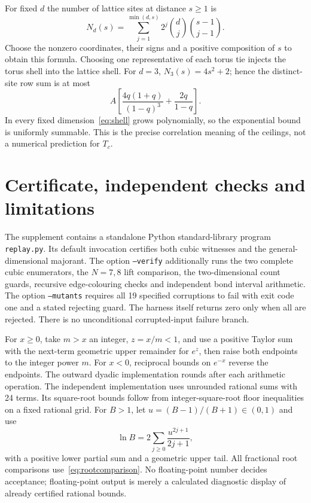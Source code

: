 \documentclass[11pt]{article}
\theoremstyle{plain}
\theoremstyle{remark}
\begin{document}
For fixed $d$ the number of lattice sites at distance $s\ge1$ is
\begin{equation}\label{eq:shell}
N_d(s)=\sum_{j=1}^{\min(d,s)}2^j\binom dj\binom{s-1}{j-1}.
\end{equation}
Choose the nonzero coordinates, their signs and a positive composition of
$s$ to obtain this formula. Choosing one representative of each torus tie
injects the torus shell into the lattice shell. For $d=3$, $N_3(s)=4s^2+2$;
hence the distinct-site row sum is at most
\[
A\left[\frac{4q(1+q)}{(1-q)^3}+\frac{2q}{1-q}\right].
\]
In every fixed dimension~\eqref{eq:shell} grows polynomially, so the
exponential bound is uniformly summable. This is the precise correlation
meaning of the ceilings, not a numerical prediction for $T_c$.

\section{Certificate, independent checks and limitations}\label{sec:certificate}

The supplement contains a standalone Python standard-library program
\texttt{replay.py}. Its default invocation certifies both cubic witnesses and
the general-dimensional majorant. The option \texttt{--verify} additionally
runs the two complete cubic enumerators, the $N=7,8$ lift comparison, the
two-dimensional count guards, recursive edge-colouring checks and independent
bond interval arithmetic. The option \texttt{--mutants} requires all 19
specified corruptions to fail with exit code one and a stated rejecting guard.
The harness itself returns zero only when all are rejected. There is no
unconditional corrupted-input failure branch.

For $x\ge0$, take $m> x$ an integer, $z=x/m<1$, and use a positive Taylor sum
with the next-term geometric upper remainder for $e^z$, then raise both
endpoints to the integer power $m$. For $x<0$, reciprocal bounds on $e^{-x}$
reverse the endpoints. The outward dyadic implementation rounds after each
arithmetic operation. The independent implementation uses unrounded rational
sums with 24 terms. Its square-root bounds follow from integer-square-root
floor inequalities on a fixed rational grid. For $B>1$, let
$u=(B-1)/(B+1)\in(0,1)$ and use
\[
\ln B=2\sum_{j\ge0}\frac{u^{2j+1}}{2j+1},
\]
with a positive lower partial sum and a geometric upper tail.
All fractional root comparisons use~\eqref{eq:rootcomparison}.
No floating-point number decides acceptance; floating-point output is merely
a calculated diagnostic display of already certified rational bounds.
\end{document}
